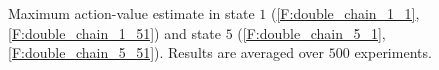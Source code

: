 \documentclass[conference]{IEEEtran}
\begin{document}
\begin{figure}[t]
\begin{minipage}{\textwidth}
\end{minipage}
\caption{Maximum action-value estimate in state $1$ (\ref{F:double_chain_1_1}, \ref{F:double_chain_1_51}) and state $5$ (\ref{F:double_chain_5_1}, \ref{F:double_chain_5_51}). Results are averaged over $500$ experiments.}
  \label{F:double_chain_q}
\end{figure}
\end{document}
